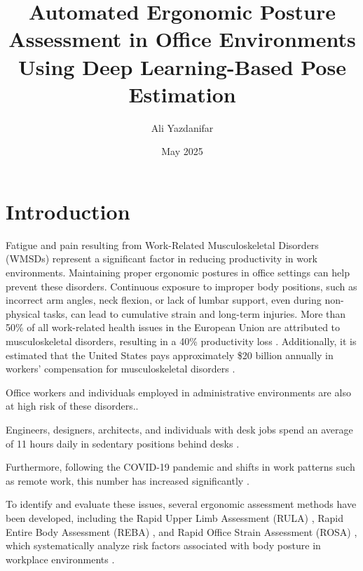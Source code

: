 \documentclass[lettersize,journal]{IEEEtran}
\title{Automated Ergonomic Posture Assessment in Office Environments Using Deep Learning-Based Pose Estimation}
\author{Ali Yazdanifar}
\date{May 2025}
\begin{document}
\maketitle

\section{Introduction}
Fatigue and pain resulting from Work-Related Musculoskeletal Disorders (WMSDs) represent a significant factor in reducing productivity in work environments. Maintaining proper ergonomic postures in office settings can help prevent these disorders. Continuous exposure to improper body positions, such as incorrect arm angles, neck flexion, or lack of lumbar support, even during non-physical tasks, can lead to cumulative strain and long-term injuries. More than 50\% of all work-related health issues in the European Union are attributed to musculoskeletal disorders, resulting in a 40\% productivity loss \cite{bevan2015economic}. Additionally, it is estimated that the United States pays approximately \$20 billion annually in workers' compensation for musculoskeletal disorders \cite{kang2014prevention}.


Office workers and individuals employed in administrative environments are also at high risk of these disorders.\cite{menanno2024ergonomic}.

Engineers, designers, architects, and individuals with desk jobs spend an average of 11 hours daily in sedentary positions behind desks \cite{tudor2011time,chu2016systematic,parry2013contribution}.

Furthermore, following the COVID-19 pandemic and shifts in work patterns such as remote work, this number has increased significantly \cite{ricci2020recommendations,xiao2021impacts,awada2021working}.

To identify and evaluate these issues, several ergonomic assessment methods have been developed, including the Rapid Upper Limb Assessment (RULA) \cite{mcatamney1993rula}, Rapid Entire Body Assessment (REBA) \cite{hignett2000reba}, and Rapid Office Strain Assessment (ROSA) \cite{sonne2012rosa}, which systematically analyze risk factors associated with body posture in workplace environments \cite{yang2024systematic}.
\end{document}
